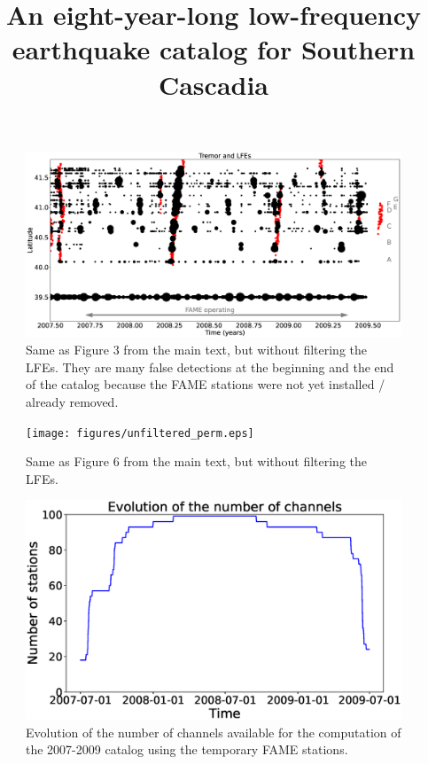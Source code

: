 \documentclass[draft]{agujournal2019}
\begin{document}
\title{An eight-year-long low-frequency earthquake catalog for Southern Cascadia}




\begin{figure}
\noindent\includegraphics[width=\textwidth, trim={0cm 0cm 0cm 0cm},clip]{figures/unfiltered_FAME.eps}
\caption{Same as Figure 3 from the main text, but without filtering the LFEs. They are many false detections at the beginning and the end of the catalog because the FAME stations were not yet installed / already removed.}
\label{pngfiguresample}
\end{figure}

\begin{figure}
\noindent\texttt{[image: figures/unfiltered\_perm.eps]}
\caption{Same as Figure 6 from the main text, but without filtering the LFEs.}
\label{pngfiguresample}
\end{figure}

\begin{figure}
\noindent\includegraphics[width=\textwidth, trim={0cm 0cm 0cm 0cm},clip]{figures/timeline_FAME.eps}
\caption{Evolution of the number of channels available for the computation of the 2007-2009 catalog using the temporary FAME stations.}
\label{pngfiguresample}
\end{figure}
\end{document}
